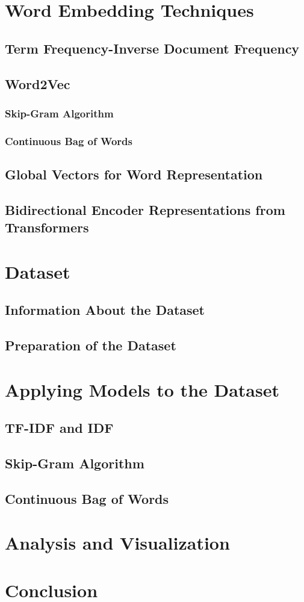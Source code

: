 \documentclass[man]{apa7}
\begin{document}
\section{Word Embedding Techniques}
\lipsum[0-1]
\subsection{Term Frequency-Inverse Document Frequency}
\lipsum[1]
\subsection{Word2Vec}
\lipsum[1]
\subsubsection{Skip-Gram Algorithm}
\subsubsection{Continuous Bag of Words}
\subsection{Global Vectors for Word Representation}
\subsection{Bidirectional Encoder Representations from Transformers}
\section{Dataset}
\subsection{Information About the Dataset}
\subsection{Preparation of the Dataset}
\section{Applying Models to the Dataset}
\subsection{TF-IDF and IDF}
\subsection{Skip-Gram Algorithm}
\subsection{Continuous Bag of Words}
\section{Analysis and Visualization}
\section{Conclusion}
\lipsum[1]
\end{document}
